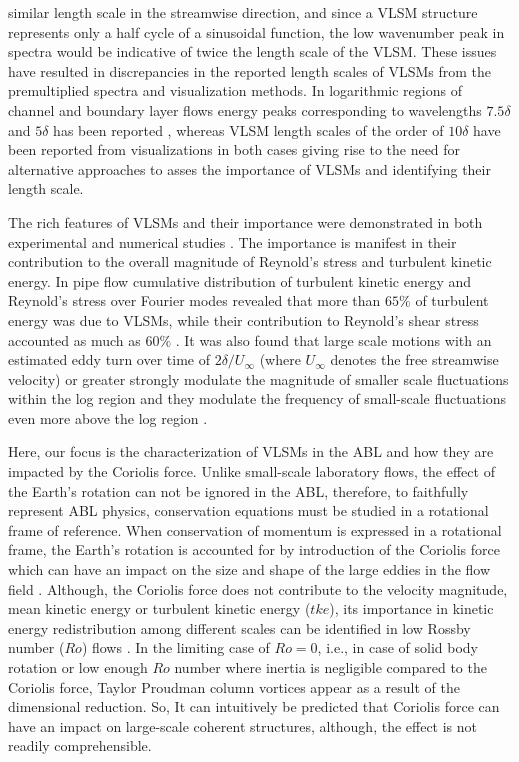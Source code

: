 \documentclass{svjour3}                     %
\begin{document}
similar length scale in the streamwise direction, and since a VLSM structure represents only a half cycle of a sinusoidal function, the low wavenumber peak in spectra would be indicative of twice the length scale of the VLSM. These issues have resulted in discrepancies in the reported length scales of VLSMs from the premultiplied spectra and visualization methods. In logarithmic regions of channel and boundary layer flows energy peaks corresponding to wavelengths $7.5\delta$ and $5\delta$ has been reported \citep{balakumar_adrian_ptrs_07}, whereas VLSM length scales of the order of $10\delta$ have been reported from visualizations in both cases \citep{Lee_sung_jfm11,lee_sung_jfm_14,hutchins_marusic_jfm2007}  giving rise to the need for alternative approaches to asses the importance of VLSMs and identifying their length scale. 
 

The rich features of VLSMs and their importance were demonstrated in both experimental \citep{kim_adrian_pof99,guala_adrian_jfm2006,hutchins_marusic_jfm2007,monty_jfm_07} and numerical studies \citep{fang2015blm,lee_sung_jfm_14,Lee_sung_jfm11}. The importance is  manifest in their  contribution to the overall magnitude of Reynold's stress and turbulent kinetic  energy. In pipe flow cumulative  distribution  of turbulent kinetic energy  and Reynold's stress  over Fourier modes revealed that more than $65\%$ of turbulent energy was due to VLSMs, while their contribution to Reynold's shear stress accounted as much as $60\%$ \citep{guala_adrian_jfm2006}. It was also found that large scale motions with an estimated eddy turn over time of $2\delta/U_{\infty}$ (where $U_{\infty}$ denotes the free streamwise velocity) or greater strongly modulate the magnitude of smaller scale fluctuations within the log region and they modulate the frequency of small-scale fluctuations even more above the log region \citep{ganapathi_jfm_2012_modulation}. 


Here, our focus is the characterization of VLSMs in the ABL and how they are impacted by the Coriolis force. Unlike small-scale laboratory flows, the effect of the Earth's rotation can not be ignored in the ABL, therefore, to faithfully represent ABL physics, conservation equations must be studied in a rotational frame of reference.  When conservation of momentum is expressed in a rotational frame, the Earth's rotation is accounted for by introduction of the Coriolis force which can have an impact on the size and shape of the large eddies in the flow field \citep{esau_jot_2002}. Although, the Coriolis force does not contribute to the velocity magnitude, mean kinetic energy or turbulent kinetic energy ($tke$), its importance in kinetic energy redistribution among different scales can be identified in low Rossby number ($Ro$) flows  \citep{yeung_zhou_pof_98,hossain_pof_94}. In the limiting case of $Ro=0$, i.e., in case of solid body rotation or low enough $Ro$ number where inertia is negligible compared to the Coriolis force, Taylor Proudman column  vortices appear as a result of the dimensional reduction. So, It can  intuitively be predicted that Coriolis force  can have an impact on large-scale coherent structures, although, the effect is not readily comprehensible.   
\end{document}
